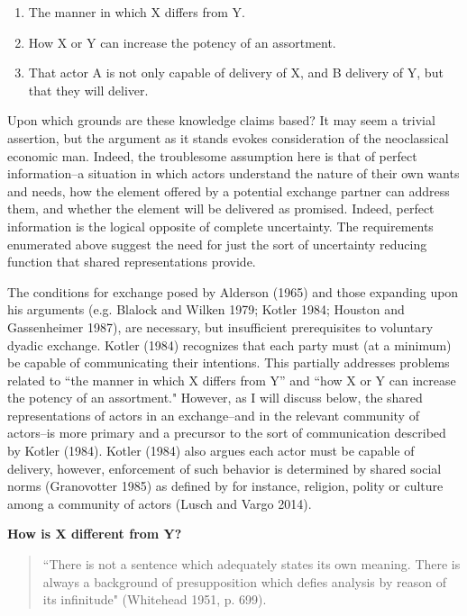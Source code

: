 \begin{enumerate}
  \item The manner in which X differs from Y.
  \item How X or Y can increase the potency of an assortment.
  \item That actor A is not only capable of delivery of X, and B delivery of Y, but that they will deliver. 
\end{enumerate}

Upon which grounds are these knowledge claims based? It may seem a trivial assertion, but the argument as it stands evokes consideration of the neoclassical economic man. Indeed, the troublesome assumption here is that of perfect information--a situation in which actors understand the nature of their own wants and needs, how the element offered by a potential exchange partner can address them, and whether the element will be delivered as promised. Indeed, perfect information is the logical opposite of complete uncertainty. The requirements enumerated above suggest the need for just the sort of uncertainty reducing function that shared representations provide. 

The conditions for exchange posed by Alderson (1965) and those expanding upon his arguments (e.g. Blalock and Wilken 1979; Kotler 1984; Houston and Gassenheimer 1987), are necessary, but insufficient prerequisites to voluntary dyadic exchange. Kotler (1984) recognizes that each party must (at a minimum) be capable of communicating their intentions. This partially addresses problems related to ``the manner in which X differs from Y'' and ``how X or Y can increase the potency of an assortment." However, as I will discuss below, the shared representations of actors in an exchange--and in the relevant community of actors--is more primary and a precursor to the sort of communication described by Kotler (1984). Kotler (1984) also argues each actor must be capable of delivery, however, enforcement of such behavior is determined by shared social norms (Granovotter 1985) as defined by for instance, religion, polity or culture among a community of actors (Lusch and Vargo 2014). 

\textbf{How is X different from Y?}
\begin{small}
\begin{quote}
``There is not a sentence which adequately states its own meaning. There is always a background of presupposition which defies analysis by reason of its infinitude" (Whitehead 1951, p. 699).
\end{quote}
\end{small}

